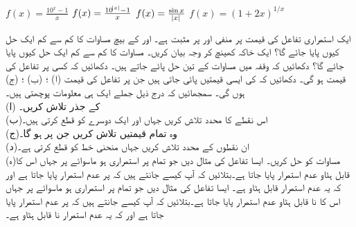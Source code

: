 $f(x)=\tfrac{10^x-1}{x}$
$f(x)=\tfrac{10^{\abs{x}}-1}{x}$
$f(x)=\tfrac{\sin x}{\abs{x}}$
$f(x)=(1+2x)^{1/x}$


ایک استمراری تفاعل  کی قیمت  پر منفی  اور  پر مثبت ہے۔ اور  کے بیچ مساوات  کا کم سے کم ایک حل کیوں  پایا جائے گا؟ ایک خاکہ کھینچ کر وجہ بیان کریں۔
مساوات  کا کم سے کم ایک حل کیوں پایا جائے گا؟
دکھائیں کہ وقفہ  میں مساوات  کے تین حل پائے جاتے ہیں۔
دکھائیں کہ کسی  پر تفاعل  کی قیمت  ہو گی۔
دکھائیں کہ  کی ایسی قیمتیں پائی جاتی ہیں جن پر تفاعل  کی قیمت (ا) ؛ (ب) ؛ (ج)  ہوں گی۔
سمجھائیں کہ درج ذیل جملے ایک ہی معلومات پوچھتی ہیں۔\\
(ا)\quad  {} کے جذر تلاش کریں۔\\
(ب)\quad  اس نقطے کا  محدد تلاش کریں جہاں  اور  ایک دوسرے کو قطع کرتی ہیں۔\\
(ج)\quad  وہ تمام قیمتیں تلاش کریں جن پر  ہو گا۔\\
(د)\quad  ان نقطوں کے  محدد تلاش کریں جہاں منحنی  خط  کو قطع کرتی ہے۔\\
(ہ)\quad  مساوات  کو حل کریں۔
ایسا تفاعل  کی مثال دیں جو تمام  پر استمراری ہو  ماسوائے  پر جہاں اس کا قابل ہٹاو عدم استمرار پایا جاتا ہے۔بتلائیں کہ آپ کیسے جانتے ہیں کہ  پر عدم استمرار پایا جاتا ہے اور کہ یہ عدم استمرار قابل ہٹاو ہے۔
ایسا تفاعل  کی مثال دیں جو تمام  پر استمراری ہو  ماسوائے  پر جہاں اس کا نا قابل ہٹاو عدم استمرار پایا جاتا ہے۔بتلائیں کہ آپ کیسے جانتے ہیں کہ  پر عدم استمرار پایا جاتا ہے اور کہ یہ عدم استمرار نا قابل ہٹاو ہے۔
\\
